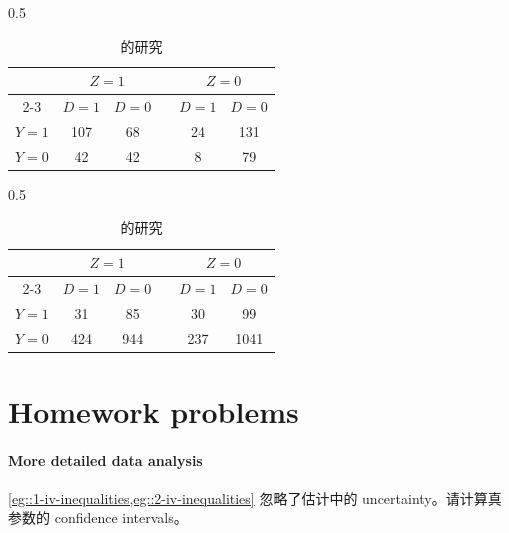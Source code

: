  \begin{table}[t]
\caption{Binary data 与 IV inequalities}
\begin{center}
\begin{subtable}{0.5\textwidth}
\caption{\citet{improve2014endovascular} 的研究}
\begin{tabular}{cccccc} 
\hline 
      &   \multicolumn{2}{c}{$Z=1$}  &  &  \multicolumn{2}{c}{$Z=0$}  \\  \cline{2-3} \cline{5-6} 
      & $D=1$  &  $D=0$           &       &  $D=1$  &  $D=0$\\
 $Y=1$ &   107    &      68         &      &    24       &    131        \\
 $Y=0$ &   42    &     42            &      &     8         &     79           \\  
 \hline
\end{tabular}
\label{tab::data1}
\end{subtable}%
\vspace{0.1in}
\begin{subtable}{0.5\textwidth}
\caption{\citet{hirano2000assessing} 的研究}
\begin{tabular}{cccccc}
\hline 
      &   \multicolumn{2}{c}{$Z=1$}  &  &  \multicolumn{2}{c}{$Z=0$}  \\  \cline{2-3} \cline{5-6} 
      & $D=1$  &  $D=0$           &       &  $D=1$  &  $D=0$\\
 $Y=1$ &   31    &     85         &      &     30       &    99       \\
 $Y=0$ &   424   &     944            &      &     237         &    1041           \\  
 \hline
\end{tabular}
\label{tab::data2}
\end{subtable}
\end{center}
\end{table}%

 
 
\section{Homework problems}

\paragraph{More detailed data analysis}\label{hw::more-data-binary}

\cref{eg::1-iv-inequalities,eg::2-iv-inequalities} 忽略了估计中的 uncertainty。请计算真参数的 confidence intervals。
 



